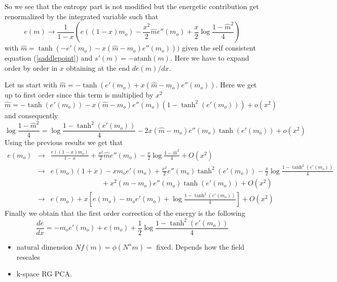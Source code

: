 \documentclass[aps,pre,noshowpacs]{revtex4}
\begin{document}
So we see that the entropy part is not modified but the energetic contribution get renormalized by the integrated variable such that
$$ e(m) \to \frac{1}{1-x} \left(e((1-x) m_o)  - \frac{x^2}{2} \hat{m} e''(m_o) + \frac{x}{2} \log \frac{1-\hat{m}^2}{4}\right)$$
with $\hat{m}=\tanh ( - e'(m_o)-x (\hat{m}-m_o) e''(m_o)) )$ given the self consistent equation (\ref{saddlepoint}) and $s'(m)=-\mbox{atanh}(m)$.
Here we have to expand order by order in $x$ obtaining at the end $de(m)/dx$.

Let us start with $\hat{m}=-\tanh(e'(m_o) + x (\hat{m}-m_o) e''(m_o))$. Here we get up to first order since this term is multiplied by $x^2$
\begin{equation}
\hat{m}= -\tanh(e'(m_o)) - x (\hat{m}-m_o) e''(m_o) (1-\tanh^2(e'(m_o))) + o(x^2)
\end{equation} 
and consequently
\begin{equation}
\log \frac{1-\hat{m}^2}{4}= \log\frac{1-\tanh^2(e'(m_o))}{4} - 2 x (\hat{m}-m_o) e''(m_o) \tanh(e'(m_o)) + o(x^2)
\end{equation} 
Using the previous results we get that
\begin{eqnarray}
e(m_o) &\to& \frac{e((1-x) m_o)}{1-x}  + \frac{x^2}{2} \hat{m} e''(m_o)-\frac{x}{2} \log \frac{1-\hat{m}^2}{4} +O(x^2)\nonumber\\
&\to& e(m_o) (1+x) - x m_o e'(m_o)  + \frac{x^2}{2}e''(m_o) \tanh^2(e'(m_o)) -\frac{x}{2}  \log\frac{1-\tanh^2(e'(m_o))}{4} \nonumber \\ && \hspace{3cm} + x^2 (\hat{m}-m_o) e''(m_o) \tanh(e'(m_o)) + O(x^2)\nonumber\\
&\to&  e(m_o) + x \left[e(m_o) - m_o e'(m_o) + \log \frac{1-\tanh^2(e'(m_o))}{4}\right] +O(x^2)
\end{eqnarray}
Finally we obtain that the first order correction of the energy is the following
\begin{equation}\label{eq:energyrenormalization}
\frac{de}{dx}= -m_o e'(m_o) + e(m_o) +\frac{1}{2} \log \frac{1-\tanh^2(e'(m_o))}{4}
\end{equation}

\begin{itemize}
\item natural dimension $N f(m) = \phi(N^\alpha m)=$ fixed. Depends how the field rescales
\item k-space RG PCA.
\end{itemize}
\end{document}
